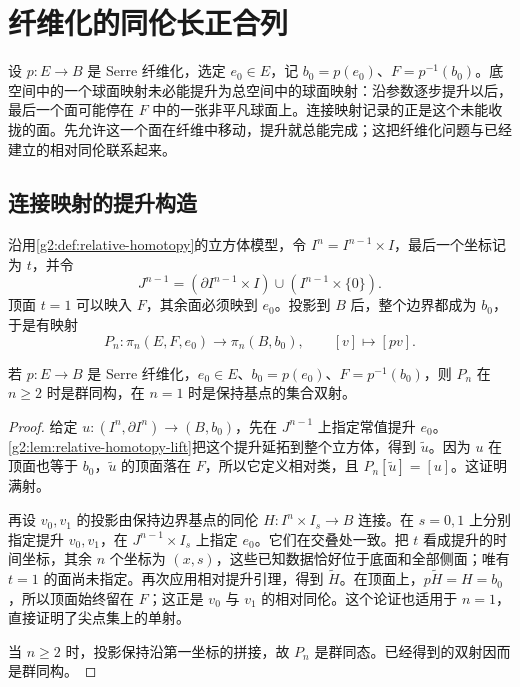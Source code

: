 
% 
% 

\section{纤维化的同伦长正合列}
\label{g2:sec:0803}

设 \(p:E\to B\) 是 Serre 纤维化，选定 \(e_0\in E\)，记 \(b_0=p(e_0)\)、\(F=p^{-1}(b_0)\)。底空间中的一个球面映射未必能提升为总空间中的球面映射：沿参数逐步提升以后，最后一个面可能停在 \(F\) 中的一张非平凡球面上。连接映射记录的正是这个未能收拢的面。先允许这一个面在纤维中移动，提升就总能完成；这把纤维化问题与已经建立的相对同伦联系起来。

\subsection{连接映射的提升构造}
\label{g2:subsec:0803:01}

沿用\cref{g2:def:relative-homotopy}的立方体模型，令 \(I^n=I^{n-1}\times I\)，最后一个坐标记为 \(t\)，并令
\[
	J^{n-1}=(\partial I^{n-1}\times I)\cup(I^{n-1}\times\{0\}).
\]
顶面 \(t=1\) 可以映入 \(F\)，其余面必须映到 \(e_0\)。投影到 \(B\) 后，整个边界都成为 \(b_0\)，于是有映射
\[
	P_n:\pi_n(E,F,e_0)\longrightarrow\pi_n(B,b_0),\qquad [v]\longmapsto[pv].
\]

\begin{proposition}
	\label{g2:prop:fibration-relative-comparison}
	若 \(p:E\to B\) 是 Serre 纤维化，\(e_0\in E\)、\(b_0=p(e_0)\)、\(F=p^{-1}(b_0)\)，则 \(P_n\) 在 \(n\ge2\) 时是群同构，在 \(n=1\) 时是保持基点的集合双射。
\end{proposition}

\begin{proof}
	给定 \(u:(I^n,\partial I^n)\to(B,b_0)\)，先在 \(J^{n-1}\) 上指定常值提升 \(e_0\)。\cref{g2:lem:relative-homotopy-lift}把这个提升延拓到整个立方体，得到 \(\widetilde u\)。因为 \(u\) 在顶面也等于 \(b_0\)，\(\widetilde u\) 的顶面落在 \(F\)，所以它定义相对类，且 \(P_n[\widetilde u]=[u]\)。这证明满射。

	再设 \(v_0,v_1\) 的投影由保持边界基点的同伦 \(H:I^n\times I_s\to B\) 连接。在 \(s=0,1\) 上分别指定提升 \(v_0,v_1\)，在 \(J^{n-1}\times I_s\) 上指定 \(e_0\)。它们在交叠处一致。把 \(t\) 看成提升的时间坐标，其余 \(n\) 个坐标为 \((x,s)\)，这些已知数据恰好位于底面和全部侧面；唯有 \(t=1\) 的面尚未指定。再次应用相对提升引理，得到 \(\widetilde H\)。在顶面上，\(p\widetilde H=H=b_0\)，所以顶面始终留在 \(F\)；这正是 \(v_0\) 与 \(v_1\) 的相对同伦。这个论证也适用于 \(n=1\)，直接证明了尖点集上的单射。

	当 \(n\ge2\) 时，投影保持沿第一坐标的拼接，故 \(P_n\) 是群同态。已经得到的双射因而是群同构。
\end{proof}

